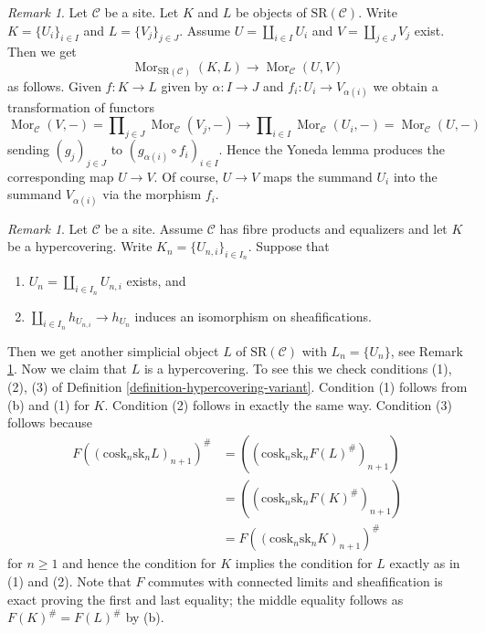 \documentclass[10pt,a4paper]{article}
\theoremstyle{plain}
\theoremstyle{definition}
\theoremstyle{remark}
\newtheorem{remark}[subsection]{Remark}
\numberwithin{equation}{subsection}
\def\Mor{\mathop{\mathrm{Mor}}\nolimits}
\begin{document}
\begin{remark}
\label{remark-taking-disjoint-unions}
Let $\mathcal{C}$ be a site. Let
$K$ and $L$ be objects of $\text{SR}(\mathcal{C})$.
Write $K = \{U_i\}_{i \in I}$ and $L = \{V_j\}_{j \in J}$.
Assume $U = \coprod_{i \in I} U_i$ and $V = \coprod_{j \in J} V_j$
exist. Then we get
$$
\Mor_{\text{SR}(\mathcal{C})}(K, L) \longrightarrow \Mor_\mathcal{C}(U, V)
$$
as follows. Given $f : K \to L$ given by $\alpha : I \to J$
and $f_i : U_i \to V_{\alpha(i)}$ we obtain a transformation of functors
$$
\Mor_\mathcal{C}(V, -) =
\prod\nolimits_{j \in J} \Mor_\mathcal{C}(V_j, -)
\to
\prod\nolimits_{i \in I} \Mor_\mathcal{C}(U_i, -) =
\Mor_\mathcal{C}(U, -)
$$
sending $(g_j)_{j \in J}$ to
$(g_{\alpha(i)} \circ f_i)_{i \in I}$. Hence the Yoneda lemma
produces the corresponding map $U \to V$. Of course, $U \to V$
maps the summand $U_i$ into the summand $V_{\alpha(i)}$ via
the morphism $f_i$.
\end{remark}

\begin{remark}
\label{remark-take-unions-hypercovering}
Let $\mathcal{C}$ be a site. Assume $\mathcal{C}$ has
fibre products and equalizers and let $K$ be a hypercovering.
Write $K_n = \{U_{n, i}\}_{i \in I_n}$. Suppose that
\begin{enumerate}
\item[(a)] $U_n = \coprod_{i \in I_n} U_{n, i}$ exists, and
\item[(b)] $\coprod_{i \in I_n} h_{U_{n, i}} \to h_{U_n}$ induces
an isomorphism on sheafifications.
\end{enumerate}
Then we get another simplicial object $L$ of $\text{SR}(\mathcal{C})$
with $L_n = \{U_n\}$, see
Remark \ref{remark-taking-disjoint-unions}.
Now we claim that $L$ is a hypercovering.
To see this we check conditions (1), (2), (3) of
Definition \ref{definition-hypercovering-variant}.
Condition (1) follows from (b) and (1) for $K$.
Condition (2) follows in exactly the same way.
Condition (3) follows because
\begin{align*}
F((\text{cosk}_n \text{sk}_n L)_{n + 1})^\#
& =
((\text{cosk}_n \text{sk}_n F(L)^\#)_{n + 1}) \\
& =
((\text{cosk}_n \text{sk}_n F(K)^\#)_{n + 1}) \\
& =
F((\text{cosk}_n \text{sk}_n K)_{n + 1})^\#
\end{align*}
for $n \geq 1$ and hence the condition for $K$ implies the condition for
$L$ exactly as in (1) and (2).
Note that $F$ commutes with connected limits and sheafification is exact
proving the first and last equality; the middle equality follows as
$F(K)^\# = F(L)^\#$ by (b).
\end{remark}
\end{document}
